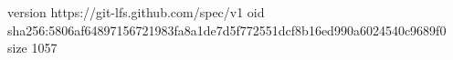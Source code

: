 version https://git-lfs.github.com/spec/v1
oid sha256:5806af64897156721983fa8a1de7d5f772551dcf8b16ed990a6024540c9689f0
size 1057
